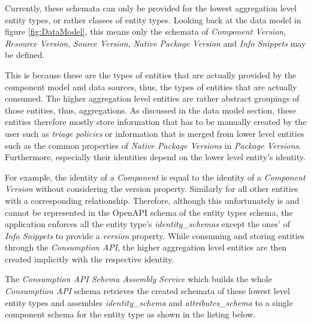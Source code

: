 Currently, these schemata can only be provided for the lowest aggregation level entity types, or rather classes of entity types. Looking back at the data model in figure \ref{fig:DataModel}, this means only the schemata of \emph{Component Version}, \emph{Resource Version}, \emph{Source Version}, \emph{Native Package Version} and \emph{Info Snippets} may be defined.\par 
This is because these are the types of entities that are actually provided by the component model and data sources, thus, the types of entities that are actually consumed. The higher aggregation level entities are rather abstract groupings of those entities, thus, aggregations. As discussed in the data model section, these entities therefore mostly store information that has to be manually created by the user such as \emph{triage policies} or information that is merged from lower level entities such as the common properties of \emph{Native Package Versions} in \emph{Package Versions}. Furthermore, especially their identities depend on the lower level entity's identity.\par
For example, the identity of a \emph{Component} is equal to the identity of a \emph{Component Version} without considering the version property. Similarly for all other entities with a corresponding relationship. Therefore, although this unfortunately is and cannot be represented in the OpenAPI schema of the entity types schema, the application enforces all the entity type's \emph{identity\_schemas} except the ones' of \emph{Info Snippets} to provide a \emph{version} property. While consuming and storing entities through the \emph{Consumption API}, the higher aggregation level entities are then created implicitly with the respective identity.\par
The \emph{Consumption API Schema Assembly Service} which builds the whole \emph{Consumption API} schema retrieves the created schemata of these lowest level entity types and assembles \emph{identity\_schema} and \emph{attributes\_schema} to a single component schema for the entity type as shown in the listing below.

